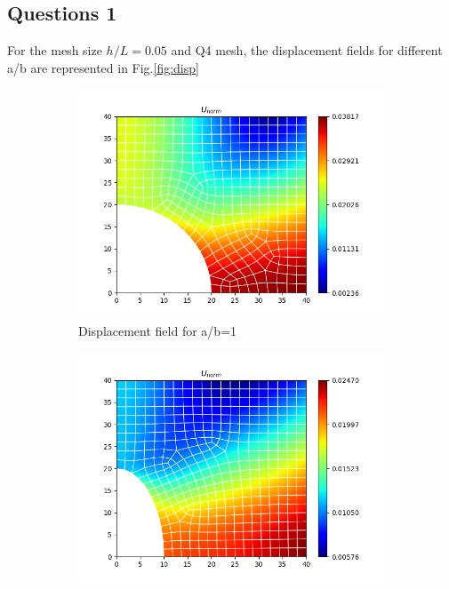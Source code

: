 \documentclass[twoside,twocolumn,10pt]{article}
\begin{document}
\subsection{Questions 1}
For the mesh size $h/L=0.05$ and Q4 mesh, the displacement fields for different a/b are represented in Fig.\ref{fig:disp}
\begin{figure}[!ht]
  \centering
  \begin{subfigure}[c]{0.32\textwidth}
    \centering
    \includegraphics[width=1.\linewidth]{Q2_1/Q1_1_2_quad.png}
    \caption{Displacement field for a/b=1}
    \label{fig:disp_1}
  \end{subfigure} 
  \hfill
  \begin{subfigure}[c]{0.32\textwidth}
    \centering
    \includegraphics[width=1.\linewidth]{Q2_1/Q1_0.5_2_quad.png}

\end{subfigure}
\end{figure}
\end{document}
